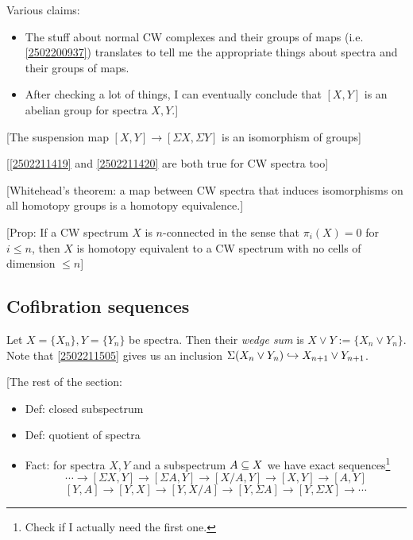 \documentclass{MetricNotes2023}
\def\subq{\ensuremath\subseteq}
\def\inj{\ensuremath\hookrightarrow}
\begin{document}
Various claims:
\begin{itemize}

\item The stuff about normal CW complexes and their groups of maps (i.e. \ref{2502200937}) translates to tell me the appropriate things about spectra and their groups of maps.
\item After checking a lot of things, I can eventually conclude that \([X, Y]\) is an abelian group for spectra \(X, Y\).]
\end{itemize}

[The suspension map \([X,Y]\to[\Sigma X, \Sigma Y]\) is an isomorphism of groups]

[\ref{2502211419} and \ref{2502211420} are both true for CW spectra too]

[Whitehead's theorem: a map between CW spectra that induces isomorphisms on all homotopy groups is a homotopy equivalence.]

[Prop: If a CW spectrum \(X\) is \(n\)-connected in the sense that \(\pi_i(X)=0\) for \(i\leq n\), then \(X\) is homotopy equivalent to a CW spectrum with no cells of dimension \(\leq n\)]

\subsection{Cofibration sequences}

\begin{definition}
Let \(X=\{X_n\}, Y=\{Y_n\}\) be spectra. Then their \textit{wedge sum}%
 is \(X\vee Y :=\{X_n \vee Y_n\}\). Note that \ref{2502211505} gives us an inclusion \(\Sigma(X_n\vee Y_n)\inj X_{n+1}\vee Y_{n+1}\). 
\end{definition}

[The rest of the section:

\begin{itemize}
\item Def: closed subspectrum
\item Def: quotient of spectra
\item Fact: for spectra \(X, Y\) and a subspectrum \(A\subq X\) we have exact sequences\footnote{Check if I actually need the first one.}
\[\cdots \to [\Sigma X, Y]\to [\Sigma A, Y]\to [X/A,Y]\to[X,Y]\to[A,Y]\]
\[[Y,A]\to[Y,X]\to[Y,X/A]\to[Y,\Sigma A]\to[Y,\Sigma X]\to\cdots\]
\end{itemize}
\end{document}

